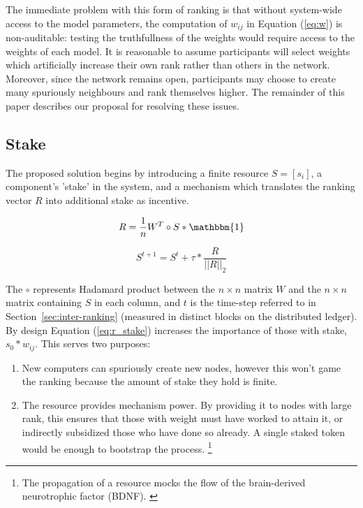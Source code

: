\documentclass{article}
\begin{document}
The immediate problem with this form of ranking is that without system-wide access to the model parameters, the computation of $w_{ij}$ in Equation (\ref{eq:w}) is non-auditable: testing the truthfullness of the weights would require access to the weights of each model. It is reasonable to assume participants will select weights which artificially increase their own rank rather than others in the network. Moreover, since the network remains open, participants may choose to create many spuriously neighbours and rank themselves higher. The remainder of this paper describes our proposal for resolving these issues.

\subsection{Stake}
\label{sec:stake}
The proposed solution begins by introducing a finite resource $ S=[s_i]$, a component's 'stake' in the system, and a mechanism which translates the ranking vector $R$ into additional stake as incentive. 

\begin{equation}
\label{eq:r_stake}
R = \frac{1}{n} W^T \circ S * \mathbbm{1}
\end{equation}

\begin{equation}
S^{t+1} = S^t + \tau * \frac{R}{||R||_2} 
\end{equation}

The $\circ$ represents Hadamard product between the $n \times n$ matrix $W$ and the $n \times n$ matrix containing $S$ in each column, and $t$ is the time-step referred to in Section~\ref{sec:inter-ranking} (measured in distinct blocks on the distributed ledger). By design Equation (\ref{eq:r_stake}) increases the importance of those with stake, $s_0 * w_{ij}$. This serves two purposes: 

\begin{enumerate}
	\item New computers can spuriously create new nodes, however this won't game the ranking because the amount of stake they hold is finite.
	\item The resource provides mechanism power. By providing it to nodes with large rank, this ensures that those with weight must have worked to attain it, or indirectly subsidized those who have done so already. A single staked token would be enough to bootstrap the process. \footnote{The propagation of a resource mocks the flow of the brain-derived neurotrophic factor (BDNF). \cite{Bathina1989neurotrophin}} 
\end{enumerate}
\end{document}
